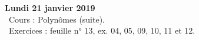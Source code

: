 \documentclass[12pt,a4paper]{article}
\begin{document}
% 
% 
% 
% 
% 
% 
% 
% 
\noindent\textbf{Lundi 21 janvier 2019} \\
\bu\ Cours : Polynômes (suite).\\
\bu\ Exercices : feuille n° 13, ex. 04, 05, 09, 10, 11 et 12.\vspace{.4cm}\\
\end{document}
